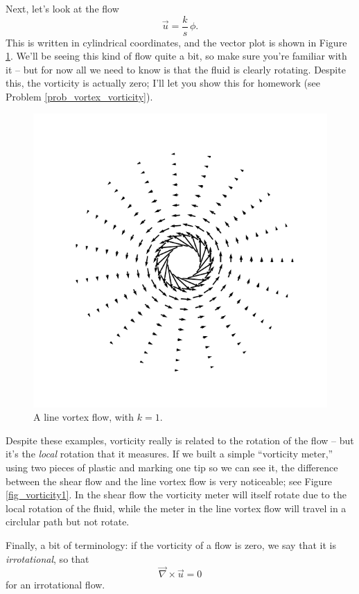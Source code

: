 \begin{example}
\label{ex_vorticity_line_vortex}
Next, let's look at the flow
\begin{equation}
\vec{u} = \frac{k}{s} \, \unit{\phi}.
\end{equation}
This is written in cylindrical coordinates, and the vector plot is shown in Figure \ref{fig_vortex}.  We'll be seeing this kind of flow quite a bit, so make sure you're familiar with it -- but for now all we need to know is that the fluid is clearly rotating.  Despite this, the vorticity is actually zero; I'll let you show this for homework (see Problem \ref{prob_vortex_vorticity}).
\end{example}

\begin{figure}
\centering
\includegraphics[width=0.5\linewidth]{Figures/Chapter1/fig_line_vortex_vector}
\caption{A line vortex flow, with $k = 1$.}
\label{fig_vortex}
\end{figure}

Despite these examples, vorticity really is related to the rotation of the flow -- but it's the \emph{local} rotation that it measures.  If we built a simple ``vorticity meter,'' using two pieces of plastic and marking one tip so we can see it, the difference between the shear flow and the line vortex flow is very noticeable; see Figure \ref{fig_vorticity1}.  In the shear flow the vorticity meter will itself rotate due to the local rotation of the fluid, while the meter in the line vortex flow will travel in a circlular path but not rotate.

Finally, a bit of terminology: if the vorticity of a flow is zero, we say that it is \emph{irrotational}, so that
\begin{equation}
\boxed{
\vec{\nabla} \times \vec{u} = 0
}
\end{equation}
for an irrotational flow.

